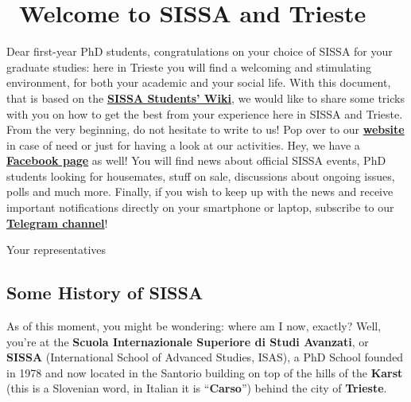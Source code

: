 \documentclass{sissavademecum}
\begin{document}
\maketitle
\tableofcontents
\newpage

\setlength{\parskip}{1em}


\chapter{\texorpdfstring{\faGlassCheers\ }{}Welcome to SISSA and Trieste}

Dear first-year PhD students, congratulations on your choice of SISSA for your graduate studies: here in Trieste you will find a welcoming and stimulating environment, for both your academic and your social life. With this document, that is based on the \href{https://wiki.sissa.it/students/index.php/Main_Page}{\textbf{SISSA Students' Wiki}}, we would like to share some tricks with you on how to get the best from your experience here in SISSA and Trieste. \\
From the very beginning, do not hesitate to write to us! Pop over to our \href{http://students.sissa.it/studentscouncil/index.html}{\textbf{website}} in case of need or just for having a look at our activities. Hey, we have a \href{https://wiki.sissa.it/students/index.php/Main_Page}{\textbf{Facebook page}} as well! You will find news about official SISSA events, PhD students looking for housemates, stuff on sale, discussions about ongoing issues, polls and much more. Finally, if you wish to keep up with the news and receive important notifications directly on your smartphone or laptop, subscribe to our \href{https://t.me/joinchat/SpDxdZat7wQJxPxz}{\textbf{Telegram channel}}!

\begin{flushright}	
	Your representatives
\end{flushright}


\section{Some History of SISSA}

As of this moment, you might be wondering: where am I now, exactly? Well, you're at the \textbf{Scuola Internazionale Superiore di Studi Avanzati}, or \textbf{SISSA} (International School of Advanced Studies, ISAS), a PhD School founded in 1978 and now located in the Santorio building on top of the hills of the \textbf{Karst} (this is a Slovenian word, in Italian it is ``\textbf{Carso}'') behind the city of \textbf{Trieste}.
\end{document}
